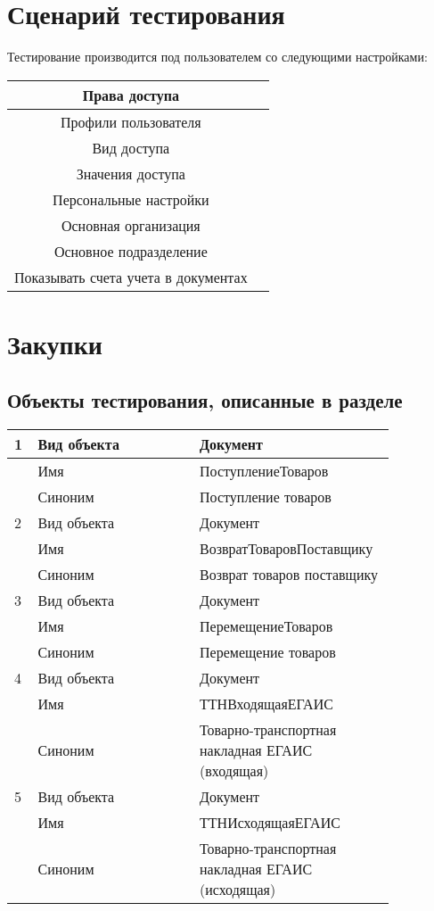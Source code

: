 \section{Сценарий тестирования}

Тестирование производится под пользователем со следующими настройками:

\begin{tabular}{|c|c|}
	\hline
	Права доступа &  \\
	\hline
	Профили пользователя &  \\
	\hline
	Вид доступа &  \\
	\hline
	Значения доступа &  \\
	\hline
	Персональные настройки &  \\
	\hline
	Основная организация &  \\
	\hline
	Основное подразделение &  \\
	\hline
	Показывать счета учета в документах &  \\
	\hline
\end{tabular}

\section{Закупки}
\subsection{Объекты тестирования, описанные в разделе}

\begin{tabular}{p{0.05\linewidth}p{0.4\linewidth}p{0.4\linewidth}}
	\toprule
	1 & Вид объекта & Документ \\
	\hline
	  & Имя & ПоступлениеТоваров \\
	\hline
	 & Синоним  & Поступление товаров \\
	\hline
	2 & Вид объекта  & Документ \\
	\hline
 	 & Имя & ВозвратТоваровПоставщику \\
	\hline
	 & Синоним  & Возврат товаров поставщику \\
	\hline
	3 & Вид объекта  & Документ \\
	\hline
	& Имя & ПеремещениеТоваров \\
	\hline
	& Синоним  & Перемещение товаров \\
	\hline
	4 & Вид объекта  & Документ \\
	\hline
	& Имя & ТТНВходящаяЕГАИС \\
	\hline
	& Синоним  & Товарно-транспортная накладная ЕГАИС (входящая) \\
	\hline
	5 & Вид объекта  & Документ \\
	\hline
	& Имя & ТТНИсходящаяЕГАИС \\
	\hline
	& Синоним  & Товарно-транспортная накладная ЕГАИС (исходящая) \\
	\bottomrule %
\end{tabular}


